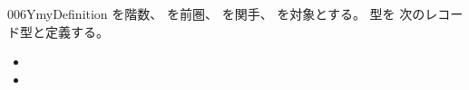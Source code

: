 \documentclass[index]{subfiles}
\begin{document}
\begin{myBlock}{006Y}{myDefinition}
  を階数、
  を前圏、
  を関手、
  を対象とする。
  型を
  次のレコード型と定義する。
  \begin{itemize}
  \item {}
  \item {}
  \end{itemize}
\end{myBlock}
\end{document}
